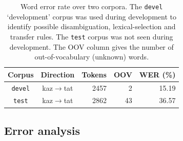 \documentclass[11pt]{article}
\newenvironment{itemise}[1]{
        \begin{itemize}\setlength{\itemsep}{-0.3em}
        \vspace{-0.6em}
        #1
}{
        \end{itemize}
        \vspace{-1pt}
}
\begin{document}
\begin{table}
  \begin{center}
  \begin{tabular}{ccrrr}
  \toprule
   Corpus                 & Direction           & Tokens  & OOV & WER (\%) \\
  \midrule
  \texttt{devel} & kaz$\rightarrow$tat & 2457    & 2       & 15.19 \\
  \bottomrule
  \texttt{test} & kaz$\rightarrow$tat & 2862    & 43      & 36.57 \\
  \end{tabular}
    \caption{Word error rate over two corpora. The \texttt{devel} `development' corpus was used during development 
       to identify possible disambiguation, lexical-selection and transfer rules. The \texttt{test} corpus
       was not seen during development. The OOV column gives the number of out-of-vocabulary (unknown) words.}
    \label{table:wer-development}
  \end{center}
\end{table}



\subsection{Error analysis}

\end{document}
